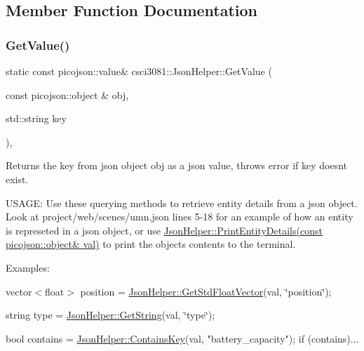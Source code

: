 \subsection{Member Function Documentation}
\mbox{\label{classcsci3081_1_1JsonHelper_a5c690dab7594cc0a33e6c17cf7afc708}} 
\subsubsection{\texorpdfstring{Get\+Value()}{GetValue()}}
{\footnotesize\ttfamily static const picojson\+::value\& csci3081\+::\+Json\+Helper\+::\+Get\+Value (\begin{DoxyParamCaption}\item[{const picojson\+::object \&}]{obj,  }\item[{std\+::string}]{key }\end{DoxyParamCaption})\hspace{0.3cm}{\ttfamily [inline]}, {\ttfamily [static]}}



Returns the key from json object obj as a json value, throws error if key doesn\textquotesingle{}t exist. 

U\+S\+A\+GE\+: Use these querying methods to retrieve entity details from a json object. Look at project/web/scenes/umn.\+json lines 5-\/18 for an example of how an entity is represeted in a json object, or use \hyperlink{classcsci3081_1_1JsonHelper_aea804b5a89146f20df5f75bbe6fdba17}{Json\+Helper\+::\+Print\+Entity\+Details(const picojson\+::object\& val)} to print the object\textquotesingle{}s contents to the terminal.

Examples\+:

{\ttfamily vector$<$float$>$ position = \hyperlink{classcsci3081_1_1JsonHelper_a0c243724051e5fb795c40701d66d844e}{Json\+Helper\+::\+Get\+Std\+Float\+Vector}(val, \char`\"{}position\char`\"{});}

{\ttfamily string type = \hyperlink{classcsci3081_1_1JsonHelper_af50a46a1f75f23c755e45b8477f69133}{Json\+Helper\+::\+Get\+String}(val, \char`\"{}type\char`\"{});}


\begin{DoxyCode}
\textcolor{keywordtype}{bool} contains = \hyperlink{classcsci3081_1_1JsonHelper_acb0d4fa20d41a93d4076b447d732d0fa}{JsonHelper::ContainsKey}(val, \textcolor{stringliteral}{"battery\_capacity"});
\textcolor{keywordflow}{if} (contains)...
\end{DoxyCode}



